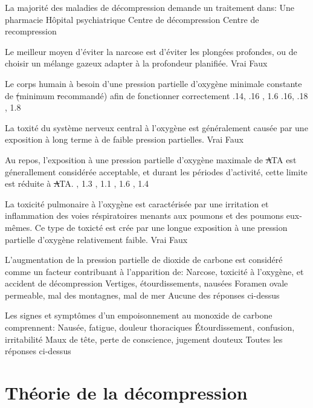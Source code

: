 \documentclass[english,10pt,a4paper,twoside]{article}
\begin{document}
\begin{outline}
		\1 La majorité des maladies de décompression demande un traitement dans:
			\2 Une pharmacie
			\2 Hôpital psychiatrique
			\2 Centre de décompression
			\2 Centre de recompression

		\1 Le meilleur moyen d'éviter la narcose est d'éviter les plongées profondes, ou de choisir un mélange gazeux adapter à la profondeur planifiée.
			\2 Vrai
			\2 Faux

		\1 Le corps humain à besoin d'une pression partielle d'oxygène minimale constante de \st (minimum \st recommandé) afin de fonctionner correctement
			\2 .14, .16 
			\2 1.4, 1.6 
			\2 .16, .18 
			\2 1.6, 1.8

		\1 La toxité du système nerveux central à l'oxygène est généralement causée par une exposition à long terme à de faible pression partielles.
			\2 Vrai
			\2 Faux

		\1 Au repos, l'exposition à une pression partielle d'oxygène maximale de \st ATA est génerallement considérée acceptable, et durant les périodes d'activité, cette limite est réduite à \st ATA.
			\2 1.1, 1.3
			\2 1.3, 1.1
			, 1.6
			, 1.4

		\1 La toxicité pulmonaire à l'oxygène est caractérisée par une irritation et inflammation des voies réspiratoires menants aux poumons et des poumons eux-mêmes. Ce type de toxicté est crée par une longue exposition à une pression partielle d'oxygène relativement faible.
			\2 Vrai
			\2 Faux

		\1 L'augmentation de la pression partielle de dioxide de carbone est considéré comme un facteur contribuant à l'apparition de:
			\2 Narcose, toxicité à l'oxygène, et accident de décompression
			\2 Vertiges, étourdissements, nausées
			\2 Foramen ovale permeable, mal des montagnes, mal de mer
			\2 Aucune des réponses ci-dessus

		\1 Les signes et symptômes d'un empoisonnement au monoxide de carbone comprennent:
			\2 Nausée, fatigue, douleur thoraciques
			\2 Étourdissement, confusion, irritabilité
			\2 Maux de tête, perte de conscience, jugement douteux
			\2 Toutes les réponses ci-dessus
	\end{outline}
	\vfill
	\pagebreak

	\section{Théorie de la décompression}
\end{document}
